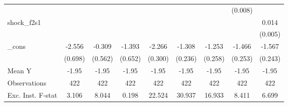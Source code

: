 {\begin{tabular}{l*{8}{c}}
            &                     &                     &                     &                     &                     &                     &     (0.008)         &                     \\
\addlinespace
shock\_f2s1  &                     &                     &                     &                     &                     &                     &                     &       0.014\sym{**} \\
            &                     &                     &                     &                     &                     &                     &                     &     (0.005)         \\
\addlinespace
\_cons      &      -2.556\sym{***}&      -0.309         &      -1.393\sym{**} &      -2.266\sym{***}&      -1.308\sym{***}&      -1.253\sym{***}&      -1.466\sym{***}&      -1.567\sym{***}\\
            &     (0.698)         &     (0.562)         &     (0.652)         &     (0.300)         &     (0.236)         &     (0.258)         &     (0.253)         &     (0.243)         \\
\midrule
Mean Y      &       -1.95         &       -1.95         &       -1.95         &       -1.95         &       -1.95         &       -1.95         &       -1.95         &       -1.95         \\
Observations&         422         &         422         &         422         &         422         &         422         &         422         &         422         &         422         \\
Exc. Inst. F-stat&       3.106         &       8.044         &       0.198         &      22.524         &      30.937         &      16.933         &       8.411         &       6.699         \\
\bottomrule
\end{tabular}
}
